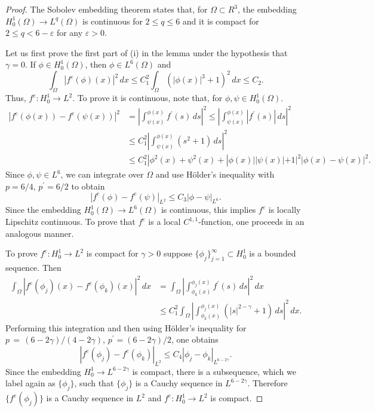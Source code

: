 \documentclass{surv-l}
\theoremstyle{plain}
\theoremstyle{definition}
\numberwithin{equation}{section}
\numberwithin{figure}{chapter}
\begin{document}
\begin{proof} The Sobolev embedding theorem states that, for $\Omega \subset R^{3}$, the embedding $H_{0}^{1}(\Omega)\rightarrow L^{q}(\Omega)$ is continuous for $2\leq q\leq 6$ and it is compact for $2\leq q<6-\varepsilon$ for any $\varepsilon>0$.

Let us first prove the first part of (i) in the lemma under the hypothesis that $\gamma=0$. If $\phi\in H_{0}^{1}(\Omega)$, then $\phi\in L^{6}(\Omega)$ and
\begin{equation*}
\int_{\Omega}|f^{e}(\phi)(x)|^{2}\,dx\leq C_{1}^{2}\int_{\Omega}(|\phi(x)|^{3}+1)^{2}\,dx\leq C_{2}.
\end{equation*}
Thus, $f^{e}\!:H_{0}^{1}\rightarrow L^{2}$. To prove it is continuous, note that, for $\phi, \psi\in H_{0}^{1}(\Omega)$.
\begin{align*}
|f^{e}(\phi(x))-f^{e}(\psi(x))|^{2}&=\left|\int_{\psi(x)}^{\phi(x)}f^{\prime}(s)\,ds\right|^{2} \leq\left|\int_{\psi(x)}^{\phi(x)}|f^{\prime}(s)|\,ds\right|^{2}\\
&\leq C_{1}^{2}\left|\int_{\psi(x)}^{\phi(x)}(s^{2}+1)\,ds\right|^{2}\\
&\leq C_{1}^{2}|\phi^{2}(x)+\psi^{2}(x)+|\phi(x)||\psi(x)|+1|^{2}|\phi(x)-\psi(x)|^{2}.
\end{align*}
Since $\phi, \psi\in L^{6}$, we can integrate over $\Omega$ and use H\"{o}lder's inequality with $p= 6/4,\, p^{\prime}=6/2$ to obtain
\begin{equation*}
|f^{e}(\phi)-f^{e}(\psi)|_{L^{2}}\leq C_{3}|\phi-\psi|_{L^{6}}.
\end{equation*}
Since the embedding $H_{0}^{1}(\Omega)\rightarrow L^{6}(\Omega)$ is continuous, this implies $f^{e}$ is locally Lipschitz continuous. To prove that $f^{e}$ is a local $C^{1,1}$-function, one proceeds in an analogous manner.

To prove $f^{e}\!:H_{0}^{1}\rightarrow L^{2}$ is compact for $\gamma>0$ suppose $\{\phi_{j}\}_{j=1}^{\infty}\subset H_{0}^{1}$ is a bounded sequence. Then
\begin{align*}
\int_{\Omega}|f^{e}(\phi_{j})(x)-f^{e}(\phi_{k})(x)|^{2}\,dx&=\int_{\Omega}\left|\int_{\phi_{k}(x)}^{\phi_{j}(x)}f^{\prime}(s)\,ds\right|^{2}\,dx\\
&\leq C_{1}^{2}\int_{\Omega}\left|\int_{\phi_{k}(x)}^{\phi_{j}(x)}(|s|^{2-\gamma}+1)\,ds\right|^{2}\,dx.
\end{align*}
Performing this integration and then using H\"{o}lder's inequality for $p\,=\, (6 - 2\gamma)/(4 - 2\gamma),\, p^{\prime}=(6 - 2\gamma)/2$, one obtains
\begin{equation*}
|f^{e}(\phi_{j})-f^{e}(\phi_{k})|_{L^{2}}\leq C_{4}|\phi_{j}-\phi_{k}|_{L^{6-2\gamma}}.
\end{equation*}
Since the embedding $H_{0}^{1}\rightarrow L^{6-2\gamma}$ is compact, there is a subsequence, which we label again as $\{\phi_{j}\}$, such that $\{\phi_{j}\}$ is a Cauchy sequence in $L^{6-2\gamma}$. Therefore $\{f^{e}(\phi_{j})\}$ is a Cauchy sequence in $L^{2}$ and $f^{e}\!:H_{0}^{1}\rightarrow L^{2}$ is compact.


\end{proof}
\end{document}
